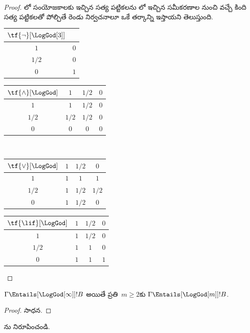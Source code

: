 \documentclass[../../../include/open-logic-section]{subfiles}
\begin{document}
\begin{proof}
  లో
   సంయోజకాలకు ఇచ్చిన సత్య పట్టికలను
   లో ఇచ్చిన సమీకరణాల నుంచి వచ్చే
   కింది సత్య పట్టికలతో పోల్చితే రెండు నిర్వచనాలూ ఒకే తర్కాన్ని ఇస్తాయని తెలుస్తుంది.
  \begin{center}
    \begin{tabular}{c|c}
      $\tf{\lnot}[\LogGod[3]]$ & \\
      \hline
      $1$ & $0$ \\
      $1/2$ & $0$ \\
      $0$ & $1$
    \end{tabular}
    \quad
    \begin{tabular}{c|ccc}
      $\tf{\land}[\LogGod]$ & $1$ & $1/2$ & $0$ \\
      \hline
      $1$ & $1$ & $1/2$ & $0$ \\
      $1/2$ & $1/2$ & $1/2$ & $0$\\
      $0$ & $0$ & $0$ & $0$
    \end{tabular}
    \\[2ex]
    \begin{tabular}{c|ccc}
      $\tf{\lor}[\LogGod]$ & $1$ & $1/2$ & $0$ \\
      \hline
      $1$ & $1$ & $1$ & $1$ \\
      $1/2$ & $1$ & $1/2$ & $1/2$ \\
      $0$ & $1$ & $1/2$ & $0$
    \end{tabular}
    \quad
    \begin{tabular}{c|ccc}
      $\tf{\lif}[\LogGod]$ & $1$ & $1/2$ & $0$ \\
      \hline
      $1$ & $1$ & $1/2$ & $0$ \\
      $1/2$ & $1$ & $1$ & $0$  \\
      $0$ & $1$ & $1$ & $1$
    \end{tabular}
  \end{center}
\end{proof}

\begin{prop}
  $\Gamma \Entails[\LogGod[\infty]] !B$
  అయితే ప్రతి~$m \ge 2$కు
  $\Gamma \Entails[\LogGod[m]] !B$.
\end{prop}

\begin{proof}
  సాధన.
\end{proof}

\begin{prob}
  ను
  నిరూపించండి.
\end{prob}
\end{document}
